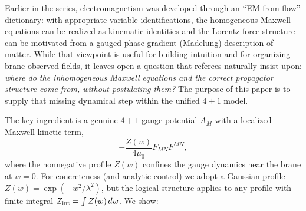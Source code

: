 \documentclass[11pt]{article}
\begin{document}
Earlier in the series, electromagnetism was developed through an ``EM-from-flow''
dictionary: with appropriate variable identifications, the homogeneous Maxwell
equations can be realized as kinematic identities and the Lorentz-force structure
can be motivated from a gauged phase-gradient (Madelung) description of matter.
While that viewpoint is useful for building intuition and for organizing
brane-observed fields, it leaves open a question that referees naturally insist
upon: \emph{where do the inhomogeneous Maxwell equations and the correct
propagator structure come from, without postulating them?} The purpose of this
paper is to supply that missing dynamical step within the unified \(4+1\) model.

The key ingredient is a genuine \(4+1\) gauge potential \(A_M\) with a localized
Maxwell kinetic term,
\[
-\frac{Z(w)}{4\mu_0}F_{MN}F^{MN},
\]
where the nonnegative profile \(Z(w)\) confines the gauge dynamics near the brane
at \(w=0\). For concreteness (and analytic control) we adopt a Gaussian profile
\(Z(w)=\exp(-w^2/\lambda^2)\), but the logical structure applies to any profile
with finite integral \(Z_{\rm int}=\int Z(w)\,dw\). We show:
\end{document}

